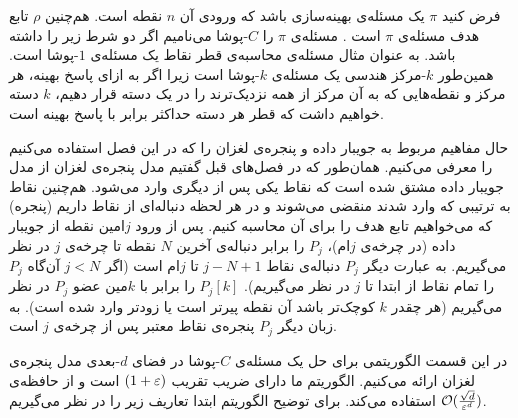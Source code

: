 فرض کنید $\pi$ یک مسئله‌ی بهینه‌سازی باشد که ورودی آن $n$ نقطه است. هم‌چنین $\rho$ تابع هدف مسئله‌ی $\pi$ است . مسئله‌ی $\pi$ را $C$-پوشا می‌نامیم اگر دو شرط زیر را داشته باشد.
به عنوان مثال مسئله‌ی محاسبه‌ی قطر نقاط یک مسئله‌ی $1$-پوشا است. همین‌طور $k$-مرکز هندسی یک مسئله‌ی $k$-پوشا است زیرا اگر به ازای پاسخ بهینه، هر مرکز و نقطه‌هایی که به آن مرکز از همه نزدیک‌ترند را در یک دسته قرار دهیم، $k$ دسته خواهیم داشت که قطر هر دسته حداکثر برابر با پاسخ بهینه است.

حال مفاهیم مربوط به جویبار داده و پنجره‌ی لغزان را که در این فصل استفاده می‌کنیم را معرفی می‌کنیم. همان‌طور که در فصل‌های قبل گفتیم مدل پنجره‌ی لغزان از مدل جویبار داده مشتق شده است که نقاط یکی پس از دیگری وارد می‌شود. هم‌چنین نقاط به ترتیبی که وارد شدند منقضی می‌شوند و در هر لحظه دنباله‌ای از نقاط داریم (پنجره) که می‌خواهیم تابع هدف را برای آن محاسبه کنیم. پس از ورود $j$امین نقطه از جویبار داده (در چرخه‌ی $j$ام)، $P_j$ را برابر دنباله‌ی آخرین $N$ نقطه تا چرخه‌ی $j$ در نظر می‌گیریم. به عبارت دیگر $P_j$ دنباله‌ی نقاط 
$j-N+1$
 تا $j$ام است (اگر $ j < N$ آن‌گاه $P_j$ را تمام نقاط از ابتدا تا $j$ در نظر می‌گیریم). $P_j[k]$ را برابر با $k$مین عضو $P_j$ در نظر می‌گیریم (هر چقدر $k$ کوچک‌تر باشد آن نقطه پیرتر است یا زودتر وارد شده است). به زبان دیگر $P_j$ پنجره‌ی نقاط معتبر پس از چرخه‌ی $j$ است.

 در این قسمت الگوریتمی برای حل یک مسئله‌ی $C$-پوشا در فضای $d$-بعدی مدل پنجره‌ی لغزان ارائه می‌کنیم. الگوریتم ما دارای ضریب تقریب $(1+\varepsilon)$ است و از حافظه‌ی $\mathcal{O}(\frac{\sqrt{d}}{\varepsilon^d})$ استفاده می‌کند. برای توضیح الگوریتم ابتدا تعاریف زیر را در نظر می‌گیریم.
 
